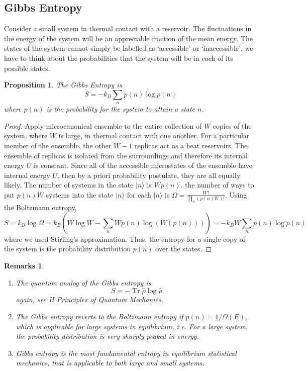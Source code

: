 \documentclass[a4paper]{article}
\DeclareMathOperator{\Tr}{Tr}
\newtheorem{remarks}{Remarks}[section]
\theoremstyle{new}
\newtheorem{prop}{Proposition}[section]
\begin{document}
\subsection{Gibbs Entropy}
Consider a small system in thermal contact with a reservoir. The fluctuations in the energy of the system will be an appreciable fraction of the mean energy. The states of the system cannot simply be labelled as `accessible' or `inaccessible', we have to think about the probabilities that the system will be in each of its possible states.
\begin{prop}
The Gibbs Entropy is
$$S=-k_B\sum_np(n)\log p(n)$$
where $p(n)$ is the probability for the system to attain a state $n$.
\end{prop}
\begin{proof}
Apply microcanonical ensemble to the entire collection of $W$ copies of the system, where $W$ is large, in thermal contact with one another. For a particular member of the ensemble, the other $W-1$ replicas act as a heat reservoirs. The ensemble of replicas is isolated from the surroundings and therefore its internal energy $U$ is constant. Since all of the accessible microstates of the ensemble have internal energy $U$, then by a priori probability postulate, they are all equally likely. The number of systems in the state $|n\rangle$ is $Wp(n)$. the number of ways to put $p(n)W$ systems into the state $|n\rangle$ for each $|n\rangle$ is $\Omega=\frac{W!}{\prod_n(p(n)W)!}$. Using the Boltzmann entropy,
$$S=k_B\log\Omega=k_B(W\log W-\sum_n Wp(n)\log(W(p(n))))=-k_BW\sum_np(n)\log p(n)$$
where we used Stirling's approximation. Thus, the entropy for a single copy of the system is the probability distribution $p(n)$ over the states.
\end{proof}
\begin{remarks}\leavevmode
\begin{enumerate}
    \item The quantum analog of the Gibbs entropy is
    $$S=-\Tr\hat{\rho}\log\hat{\rho}$$
    again, see II Principles of Quantum Mechanics.
    \item The Gibbs entropy reverts to the Boltzmann entropy if $p(n)=1/\Omega(E)$, which is applicable for large systems in equilibrium, i.e. For a large system, the probability distribution is very sharply peaked in energy.
    \item Gibbs entropy is the most fundamental entropy in equilibrium statistical mechanics, that is applicable to both large and small systems.
\end{enumerate}
\end{remarks}
\end{document}
